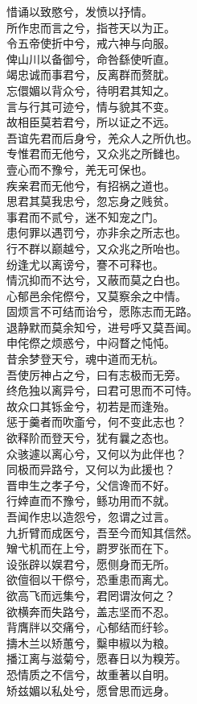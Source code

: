 \documentclass[]{article}
\begin{document}
惜诵以致愍兮，发愤以抒情。\\
所作忠而言之兮，指苍天以为正。\\
令五帝使折中兮，戒六神与向服。\\
俾山川以备御兮，命咎繇使听直。\\
竭忠诚而事君兮，反离群而赘肬。\\
忘儇媚以背众兮，待明君其知之。\\
言与行其可迹兮，情与貌其不变。\\
故相臣莫若君兮，所以证之不远。\\
吾谊先君而后身兮，羌众人之所仇也。\\
专惟君而无他兮，又众兆之所雠也。\\
壹心而不豫兮，羌无可保也。\\
疾亲君而无他兮，有招祸之道也。\\
思君其莫我忠兮，忽忘身之贱贫。\\
事君而不贰兮，迷不知宠之门。\\
患何罪以遇罚兮，亦非余之所志也。\\
行不群以巅越兮，又众兆之所咍也。\\
纷逢尤以离谤兮，謇不可释也。\\
情沉抑而不达兮，又蔽而莫之白也。\\
心郁邑余侘傺兮，又莫察余之中情。\\
固烦言不可结而诒兮，愿陈志而无路。\\
退静默而莫余知兮，进号呼又莫吾闻。\\
申侘傺之烦惑兮，中闷瞀之忳忳。\\
昔余梦登天兮，魂中道而无杭。\\
吾使厉神占之兮，曰有志极而无旁。\\
终危独以离异兮，曰君可思而不可恃。\\
故众口其铄金兮，初若是而逢殆。\\
惩于羹者而吹齑兮，何不变此志也？\\
欲释阶而登天兮，犹有曩之态也。\\
众骇遽以离心兮，又何以为此伴也？\\
同极而异路兮，又何以为此援也？\\
晋申生之孝子兮，父信谗而不好。\\
行婞直而不豫兮，鲧功用而不就。\\
吾闻作忠以造怨兮，忽谓之过言。\\
九折臂而成医兮，吾至今而知其信然。\\
矰弋机而在上兮，罻罗张而在下。\\
设张辟以娱君兮，愿侧身而无所。\\
欲儃徊以干傺兮，恐重患而离尤。\\
欲高飞而远集兮，君罔谓汝何之？\\
欲横奔而失路兮，盖志坚而不忍。\\
背膺牉以交痛兮，心郁结而纡轸。\\
擣木兰以矫蕙兮，糳申椒以为粮。\\
播江离与滋菊兮，愿春日以为糗芳。\\
恐情质之不信兮，故重著以自明。\\
矫兹媚以私处兮，愿曾思而远身。
\end{document}
